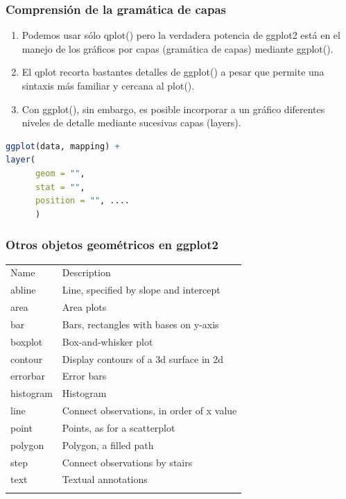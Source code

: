 \documentclass[8pt,ignorenonframetext,]{beamer}
\begin{document}
\begin{frame}[fragile]\frametitle{Comprensión de la gramática de capas}

\begin{enumerate}
\def\labelenumi{\arabic{enumi}.}
\item
  Podemos usar sólo qplot() pero la verdadera potencia de ggplot2 está
  en el manejo de los gráficos por capas (gramática de capas) mediante
  ggplot().
\item
  El qplot recorta bastantes detalles de ggplot() a pesar que permite
  una sintaxis más familiar y cercana al plot().
\item
  Con ggplot(), sin embargo, es posible incorporar a un gráfico
  diferentes niveles de detalle mediante sucesivas capas (layers).
\end{enumerate}

\begin{lstlisting}[language=R]
ggplot(data, mapping) +
layer( 
      geom = "",  
      stat = "",  
      position = "", ....  
      )
\end{lstlisting}

\end{frame}

\begin{frame}\frametitle{Otros objetos geométricos en ggplot2}

\begin{longtable}[c]{@{}ll@{}}
\hline\noalign{\medskip}
Name & Description
\\\noalign{\medskip}
\hline\noalign{\medskip}
abline & Line, specified by slope and intercept
\\\noalign{\medskip}
area & Area plots
\\\noalign{\medskip}
bar & Bars, rectangles with bases on y-axis
\\\noalign{\medskip}
boxplot & Box-and-whisker plot
\\\noalign{\medskip}
contour & Display contours of a 3d surface in 2d
\\\noalign{\medskip}
errorbar & Error bars
\\\noalign{\medskip}
histogram & Histogram
\\\noalign{\medskip}
line & Connect observations, in order of x value
\\\noalign{\medskip}
point & Points, as for a scatterplot
\\\noalign{\medskip}
polygon & Polygon, a filled path
\\\noalign{\medskip}
step & Connect observations by stairs
\\\noalign{\medskip}
text & Textual annotations
\\\noalign{\medskip}
\hline
\end{longtable}

\end{frame}
\end{document}
